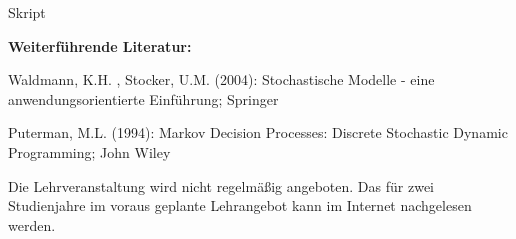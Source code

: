 \begin{course}
\begin{media}
\end{media}

\begin{literature}Skript

 

\textbf{Weiterführende Literatur:}

 

Waldmann, K.H. , Stocker, U.M. (2004): Stochastische Modelle - eine anwendungsorientierte Einführung; Springer

 

Puterman, M.L. (1994): Markov Decision Processes: Discrete Stochastic Dynamic Programming; John Wiley

\end{literature}

\begin{remarks}Die Lehrveranstaltung wird nicht regelmäßig angeboten. Das für zwei Studienjahre im voraus geplante Lehrangebot kann im Internet nachgelesen werden.

\end{remarks}

\end{course}